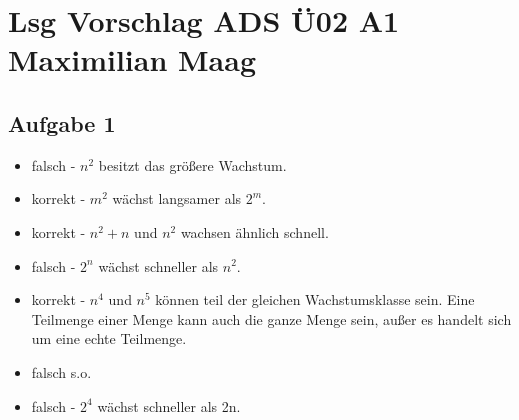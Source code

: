 \documentclass{article}
\begin{document}
	\section*{Lsg Vorschlag ADS Ü02 A1 Maximilian Maag}
	
	\subsection*{Aufgabe 1}
	\begin{itemize}
		\item falsch - $n^2$ besitzt das größere Wachstum.
		\item korrekt - $m^2$ wächst langsamer als $2^m$.
		\item korrekt - $n^2+n$ und $n^2$ wachsen ähnlich schnell.
		\item falsch - $2^n$ wächst schneller als $n^2$.
		\item korrekt - $n^4$ und $n^5$ können teil der gleichen Wachstumsklasse sein. Eine Teilmenge einer Menge kann auch die ganze Menge sein, außer es handelt sich um eine echte Teilmenge. 
		\item falsch s.o.
		\item falsch - $2^4$ wächst schneller als 2n.
	\end{itemize}
\end{document}
